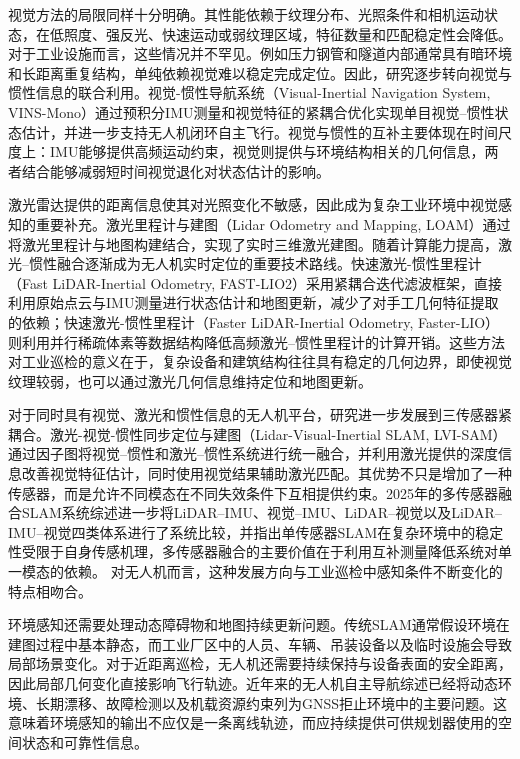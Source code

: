 视觉方法的局限同样十分明确。其性能依赖于纹理分布、光照条件和相机运动状态，在低照度、强反光、快速运动或弱纹理区域，特征数量和匹配稳定性会降低。对于工业设施而言，这些情况并不罕见。例如压力钢管和隧道内部通常具有暗环境和长距离重复结构，单纯依赖视觉难以稳定完成定位\cite{Ozaslan2017Penstocks}。因此，研究逐步转向视觉与惯性信息的联合利用。视觉-惯性导航系统（Visual-Inertial Navigation System, VINS-Mono）通过预积分IMU测量和视觉特征的紧耦合优化实现单目视觉--惯性状态估计，并进一步支持无人机闭环自主飞行\cite{Qin2018VINS}。视觉与惯性的互补主要体现在时间尺度上：IMU能够提供高频运动约束，视觉则提供与环境结构相关的几何信息，两者结合能够减弱短时间视觉退化对状态估计的影响。

激光雷达提供的距离信息使其对光照变化不敏感，因此成为复杂工业环境中视觉感知的重要补充。激光里程计与建图（Lidar Odometry and Mapping, LOAM）通过将激光里程计与地图构建结合，实现了实时三维激光建图\cite{Zhang2014LOAM}。随着计算能力提高，激光--惯性融合逐渐成为无人机实时定位的重要技术路线。快速激光-惯性里程计（Fast LiDAR-Inertial Odometry, FAST-LIO2）采用紧耦合迭代滤波框架，直接利用原始点云与IMU测量进行状态估计和地图更新，减少了对手工几何特征提取的依赖\cite{Xu2022FASTLIO2,shan2020liosam,wu2025dalislam,kim2024adaptiveuavlio}；快速激光-惯性里程计（Faster LiDAR-Inertial Odometry, Faster-LIO）则利用并行稀疏体素等数据结构降低高频激光--惯性里程计的计算开销\cite{Bai2022FasterLIO}。这些方法对工业巡检的意义在于，复杂设备和建筑结构往往具有稳定的几何边界，即使视觉纹理较弱，也可以通过激光几何信息维持定位和地图更新。

对于同时具有视觉、激光和惯性信息的无人机平台，研究进一步发展到三传感器紧耦合。激光-视觉-惯性同步定位与建图（Lidar-Visual-Inertial SLAM, LVI-SAM）通过因子图将视觉--惯性和激光--惯性系统进行统一融合，并利用激光提供的深度信息改善视觉特征估计，同时使用视觉结果辅助激光匹配\cite{Shan2021LVISAM}。其优势不只是增加了一种传感器，而是允许不同模态在不同失效条件下互相提供约束。2025年的多传感器融合SLAM系统综述进一步将LiDAR--IMU、视觉--IMU、LiDAR--视觉以及LiDAR--IMU--视觉四类体系进行了系统比较，并指出单传感器SLAM在复杂环境中的稳定性受限于自身传感机理，多传感器融合的主要价值在于利用互补测量降低系统对单一模态的依赖\cite{Fan2025FusionSLAM,lin2022r3live,zheng2025fastlivo2,pfreundschuh2024coinlio,zhang2024lviofusion}。 对无人机而言，这种发展方向与工业巡检中感知条件不断变化的特点相吻合。

环境感知还需要处理动态障碍物和地图持续更新问题。传统SLAM通常假设环境在建图过程中基本静态，而工业厂区中的人员、车辆、吊装设备以及临时设施会导致局部场景变化。对于近距离巡检，无人机还需要持续保持与设备表面的安全距离，因此局部几何变化直接影响飞行轨迹。近年来的无人机自主导航综述已经将动态环境、长期漂移、故障检测以及机载资源约束列为GNSS拒止环境中的主要问题\cite{Chang2023GNSSDenied,Alqudsi2026GNSSDenied,wang2024dynamicsurvey}。这意味着环境感知的输出不应仅是一条离线轨迹，而应持续提供可供规划器使用的空间状态和可靠性信息。


